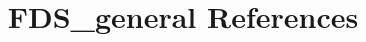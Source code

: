 \documentclass[12pt]{article}
\begin{document}
\nocite{*}
\title{FDS\_general References}
\maketitle

%



\end{document}
